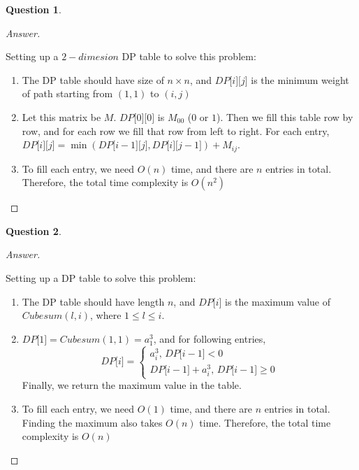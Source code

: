 \documentclass{article}
\theoremstyle{plain}
\newtheorem{question}{Question}
\newenvironment{answer}[1][Answer]
    {\begin{proof}[#1]{$ $}\renewcommand\qedsymbol{$\vartriangle$}}
    {\end{proof}}
\begin{document}
\begin{question}
\end{question}
\begin{answer}
    \begin{enumerate}
        Setting up a $2-dimesion$ DP table to solve this problem:
        \begin{enumerate}
            \item
            The DP table should have size of $n \times n$, and $DP \lbrack i \rbrack \lbrack j \rbrack$ is the minimum weight of path starting from $(1, 1)$ to $(i, j)$
            \item
            Let this matrix be $M$. $DP \lbrack 0 \rbrack \lbrack 0 \rbrack$ is $M_{00}$ ($0$ or $1$). Then we fill this table row by row, and for each row we fill that row from left to right. For each entry, $DP \lbrack i \rbrack \lbrack j \rbrack = \min (DP \lbrack i-1 \rbrack \lbrack j \rbrack, DP \lbrack i \rbrack \lbrack j-1 \rbrack) + M_{ij}$.
            \item
            To fill each entry, we need $O(n)$ time, and there are $n$ entries in total. Therefore, the total time complexity is $O(n^2)$
        \end{enumerate}
    \end{enumerate}
\end{answer}

\begin{question}
\end{question}
\begin{answer}
    \begin{enumerate}
        Setting up a  DP table to solve this problem:
        \begin{enumerate}
            \item
            The DP table should have length $n$, and $DP \lbrack i \rbrack$ is the maximum value of $Cubesum(l, i)$, where $1 \leq l \leq i$.
            \item
            $DP \lbrack 1 \rbrack = Cubesum(1, 1) = a_1^3 $, and for following entries,
            \begin{equation*}
                DP \lbrack i \rbrack =
                \begin{cases}
                    a_i^3,\, DP \lbrack i-1 \rbrack < 0\\
                    DP \lbrack i-1 \rbrack + a_i^3,\, DP \lbrack i-1 \rbrack \geq 0
                \end{cases}
            \end{equation*}
            Finally, we return the maximum value in the table.
            \item
            To fill each entry, we need $O(1)$ time, and there are $n$ entries in total. Finding the maximum also takes $O(n)$ time. Therefore, the total time complexity is $O(n)$
        \end{enumerate}
    \end{enumerate}
\end{answer}
\end{document}
